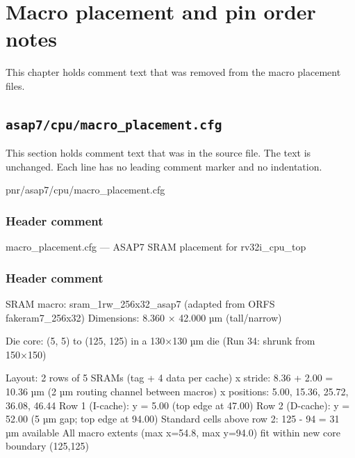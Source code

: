 \chapter{Macro placement and pin order notes}\label{tm:ch:pd-macro-placement-notes}

This chapter holds comment text that was removed from the macro placement files.

\section{\texttt{asap7/cpu/macro\_placement.cfg}}\label{tm:pd:asap7-cpu-macro-placement-cfg}

This section holds comment text that was in the source file. The text is unchanged. Each line has no leading comment marker and no indentation.

\begin{relocated}{pnr/asap7/cpu/macro_placement.cfg}

\subsection*{Header comment}

\begin{textblock}
macro_placement.cfg — ASAP7 SRAM placement for rv32i_cpu_top
\end{textblock}

\subsection*{Header comment}

\begin{textblock}
SRAM macro: sram_1rw_256x32_asap7 (adapted from ORFS fakeram7_256x32)
  Dimensions: 8.360 × 42.000 µm (tall/narrow)

Die core: (5, 5) to (125, 125) in a 130×130 µm die (Run 34: shrunk from 150×150)

Layout: 2 rows of 5 SRAMs (tag + 4 data per cache)
  x stride: 8.36 + 2.00 = 10.36 µm (2 µm routing channel between macros)
  x positions: 5.00, 15.36, 25.72, 36.08, 46.44
  Row 1 (I-cache): y = 5.00 (top edge at 47.00)
  Row 2 (D-cache): y = 52.00 (5 µm gap; top edge at 94.00)
  Standard cells above row 2: 125 - 94 = 31 µm available
  All macro extents (max x=54.8, max y=94.0) fit within new core boundary (125,125)
\end{textblock}

\end{relocated}


